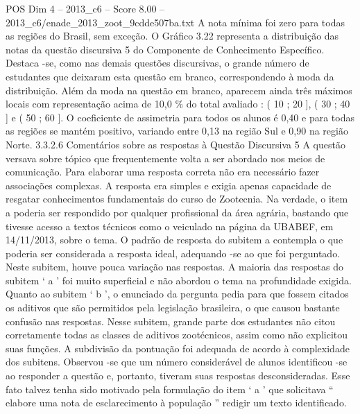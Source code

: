 \begin{textsample}{POS Dim 4 – 2013\_c6 – Score 8.00 – 2013\_c6/enade\_2013\_zoot\_9cdde507ba.txt}
A nota mínima foi zero para todas as regiões do Brasil, sem exceção.
O Gráfico 3.22 representa a distribuição das notas da questão discursiva 5 do Componente de Conhecimento Específico.
Destaca -se, como nas demais questões discursivas, o grande número de estudantes que deixaram esta questão em branco, correspondendo à moda da distribuição.
Além da moda na questão em branco, aparecem ainda três máximos locais com representação acima de 10,0 \% do total avaliado : ( 10 ; 20 ], ( 30 ; 40 ] e ( 50 ; 60 ].
O coeficiente de assimetria para todos os alunos é 0,40 e para todas as regiões se mantém positivo, variando entre 0,13 na região Sul e 0,90 na região Norte. 3.3.2.6 Comentários sobre as respostas à Questão Discursiva 5 A questão versava sobre tópico que frequentemente volta a ser abordado nos meios de comunicação.
Para elaborar uma resposta correta não era necessário fazer associações complexas.
A resposta era simples e exigia apenas capacidade de resgatar conhecimentos fundamentais do curso de Zootecnia.
Na verdade, o item a poderia ser respondido por qualquer profissional da área agrária, bastando que tivesse acesso a textos técnicos como o veiculado na página da UBABEF, em 14/11/2013, sobre o tema.
O padrão de resposta do subitem a contempla o que poderia ser considerada a resposta ideal, adequando -se ao que foi perguntado.
Neste subitem, houve pouca variação nas respostas.
A maioria das respostas do subitem ‘ a ’ foi muito superficial e não abordou o tema na profundidade exigida.
Quanto ao subitem ‘ b ’, o enunciado da pergunta pedia para que fossem citados os aditivos que são permitidos pela legislação brasileira, o que causou bastante confusão nas respostas.
Nesse subitem, grande parte dos estudantes não citou corretamente todas as classes de aditivos zootécnicos, assim como não explicitou suas funções.
A subdivisão da pontuação foi adequada de acordo à complexidade dos subitens.
Observou -se que um número considerável de alunos identificou -se ao responder a questão e, portanto, tiveram suas respostas desconsideradas.
Esse fato talvez tenha sido motivado pela formulação do item ‘ a ’ que solicitava “ elabore uma nota de esclarecimento à população ” redigir um texto identificado.

\end{textsample}
